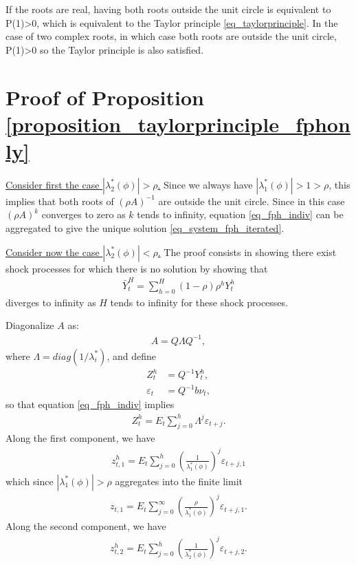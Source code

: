 If the roots are real, having both roots outside the unit circle is equivalent to P(1)>0, which is equivalent to the Taylor principle \eqref{eq_taylorprinciple}. In the case of two complex roots, in which case both roots are outside the unit circle, P(1)>0 so the Taylor principle is also satisfied.


\section{Proof of Proposition \ref{proposition_taylorprinciple_fphonly}}\label{appendix_stability_fph}

\underline{Consider first the case $|\lambda_2^*(\phi)|>\rho$.} Since we always have $|\lambda_1^*(\phi)|>1>\rho$, this implies that both roots of $(\rho A)^{-1}$ are outside the unit circle. Since in this case $(\rho A)^k$ converges to zero as $k$ tends to infinity, equation \eqref{eq_fph_indiv} can be aggregated to give the unique solution \eqref{eq_system_fph_iterated}.

\noindent \underline{Consider now the case $|\lambda_2^*(\phi)|<\rho$.} The proof consists in showing there exist shock processes for which there is no solution by showing that 
\begin{align}
\bar{Y}_t^H = \sum_{h=0}^H (1-\rho) \rho^h Y_t^{h}
\end{align}
diverges to infinity as $H$ tends to infinity for these shock processes.

Diagonalize $A$ as:
\begin{align}
A = Q \Lambda Q^{-1},\label{eq_diagonalization}
\end{align}
where $\Lambda=diag(1/\lambda_i^*)$, and define
\begin{align}
Z_t^h &= Q^{-1} Y_t^h,\\
\varepsilon_t &= Q^{-1}b \nu_t,
\end{align}
so that equation \eqref{eq_fph_indiv} implies
\begin{align}
Z_t^h =  E_t \sum_{j=0}^h \Lambda^j \varepsilon_{t+j}.
\end{align}
Along the first component, we have
\begin{align}
z_{t,1}^{h} = E_t \sum_{j=0}^h \left(\frac{1}{\lambda_1^*(\phi)}\right)^j \varepsilon_{t+j,1}
\end{align}
which since $|\lambda_1^*(\phi)|>\rho$ aggregates into the finite limit
\begin{align}
z_{t,1} = E_t \sum_{j=0}^\infty \left(\frac{\rho}{\lambda_1^*(\phi)}\right)^j \varepsilon_{t+j,1}.
\end{align}
Along the second component, we have
\begin{align}
z_{t,2}^{h} = E_t \sum_{j=0}^h \left(\frac{1}{\lambda_2^*(\phi)}\right)^j \varepsilon_{t+j,2}.
\end{align}

